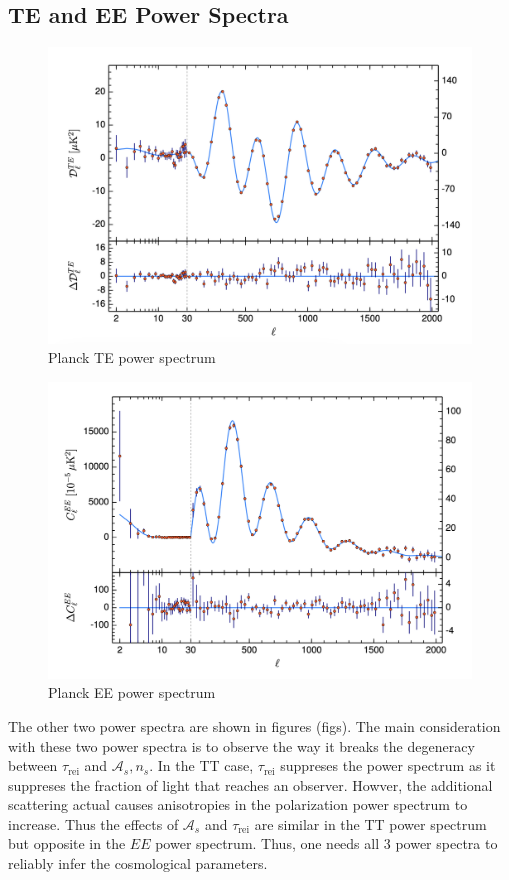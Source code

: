 \subsection{TE and EE Power Spectra}
\begin{figure}
    \centering
    \includegraphics[width=12cm]{plots/planck_TE.png}
    \caption{Planck TE power spectrum}
    \label{fig:planck_te}
\end{figure}
\begin{figure}
    \centering
    \includegraphics[width=12cm]{plots/planck_EE.png}
    \caption{Planck EE power spectrum}
    \label{fig:planck_ee}
\end{figure}
The other two power spectra are shown in figures (figs). The main consideration with these two power spectra is to observe the way it breaks the degeneracy between $\tau_\mathrm{rei}$ and $\mathcal{A}_s,n_s$. In the TT case,  $\tau_{\mathrm{rei}}$ suppreses the power spectrum as it suppreses the fraction of light that reaches an observer. Howver, the additional scattering actual causes anisotropies in the polarization power spectrum to increase. Thus the effects of $\mathcal{A}_s$ and $\tau_\mathrm{rei}$ are similar in the TT power spectrum but opposite in the $EE$ power spectrum. Thus, one needs all 3 power spectra to reliably infer the cosmological parameters.
